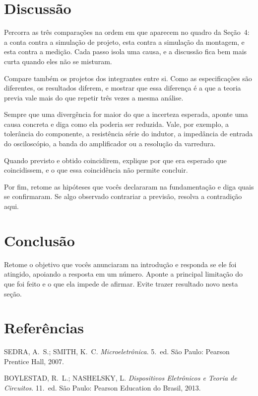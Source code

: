 \documentclass[11pt,a4paper]{article}
\begin{document}
\section{Discussão}

Percorra as três comparações na ordem em que aparecem no quadro da Seção~4: a conta contra
a simulação de projeto, esta contra a simulação da montagem, e esta contra a medição. Cada
passo isola uma causa, e a discussão fica bem mais curta quando eles não se misturam.

Compare também os projetos dos integrantes entre si. Como as especificações são diferentes,
os resultados diferem, e mostrar que essa diferença é a que a teoria previa vale mais do
que repetir três vezes a mesma análise.

Sempre que uma divergência for maior do que a incerteza esperada, aponte uma causa concreta
e diga como ela poderia ser reduzida. Vale, por exemplo, a tolerância do componente, a
resistência série do indutor, a impedância de entrada do osciloscópio, a banda do
amplificador ou a resolução da varredura.

Quando previsto e obtido coincidirem, explique por que era esperado que coincidissem, e o
que essa coincidência não permite concluir.

Por fim, retome as hipóteses que vocês declararam na fundamentação e diga quais se
confirmaram. Se algo observado contrariar a previsão, resolva a contradição aqui.

\section{Conclusão}

Retome o objetivo que vocês anunciaram na introdução e responda se ele foi atingido,
apoiando a resposta em um número. Aponte a principal limitação do que foi feito e o que
ela impede de afirmar. Evite trazer resultado novo nesta seção.

\section{Referências}

\begin{referencias}
\item SEDRA, A.~S.; SMITH, K.~C. \emph{Microeletrônica}. 5.~ed. São Paulo: Pearson
      Prentice Hall, 2007.
\item BOYLESTAD, R.~L.; NASHELSKY, L. \emph{Dispositivos Eletrônicos e Teoria de
      Circuitos}. 11.~ed. São Paulo: Pearson Education do Brasil, 2013.
\end{referencias}
\end{document}
